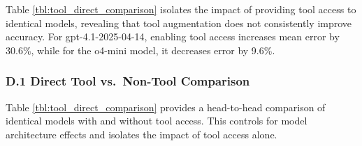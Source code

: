 \documentclass[
  10pt]{article}
\begin{document}
Table \ref{tbl:tool_direct_comparison} isolates the impact of providing
tool access to identical models, revealing that tool augmentation does
not consistently improve accuracy. For gpt-4.1-2025-04-14, enabling tool
access increases mean error by 30.6\%, while for the o4-mini model, it
decreases error by 9.6\%.

\subsubsection{D.1 Direct Tool vs.~Non-Tool
Comparison}\label{d.1-direct-tool-vs.-non-tool-comparison}

Table \ref{tbl:tool_direct_comparison} provides a head-to-head
comparison of identical models with and without tool access. This
controls for model architecture effects and isolates the impact of tool
access alone.
\end{document}
